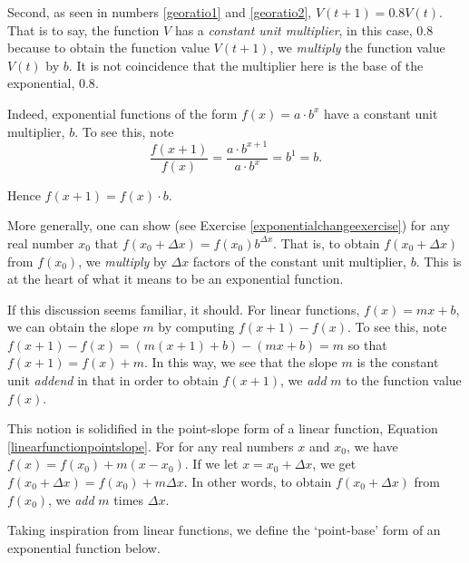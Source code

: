 \smallskip

Second, as seen in numbers \ref{georatio1} and \ref{georatio2},  $V(t+1) = 0.8 V(t)$.  That is to say, the function $V$ has a \textit{constant unit multiplier}, in this case, $0.8$ because to obtain the function value $V(t+1)$, we \textit{multiply} the function value $V(t)$ by $b$.   It is not coincidence that the multiplier here is the base of the exponential, $0.8$.

\smallskip

Indeed, exponential functions of the form $f(x) = a \cdot b^{x}$  have a constant unit multiplier, $b$.  To see this,  note \[ \dfrac{f(x+1)}{f(x)} = \dfrac{a \cdot b^{x+1}}{ a \cdot b^{x}} = b^{1} = b.\]

Hence $f(x+1) = f(x) \cdot b$.   

\smallskip

More generally, one can show (see Exercise \ref{exponentialchangeexercise}) for any real number $x_{0}$ that $f(x_{0}+\Delta x) = f(x_{0}) b^{\Delta x}$. That is, to obtain $f(x_{0} + \Delta x)$ from $f(x_{0})$, we \textit{multiply} by $\Delta x$ factors of the constant unit multiplier, $b$.  This is at the heart of what it means to be an exponential function.

\smallskip

If this discussion seems familiar, it should.  For linear functions, $f(x) = mx +b$, we can obtain the slope $m$ by computing $f(x+1) - f(x)$.  To see this, note $f(x+1) - f(x)  = (m(x+1) +b) - (mx+b) = m$ so that $f(x+1) = f(x) + m$.  In this way, we see that the slope $m$ is the constant unit \textit{addend} in that in order to obtain $f(x+1)$, we \textit{add} $m$ to the function value $f(x)$.  

\smallskip

This notion is solidified in the point-slope form of a linear function,  Equation \ref{linearfunctionpointslope}.  For for any real numbers $x$ and $x_{0}$, we have   $f(x) = f(x_{0}) + m(x-x_{0})$.  If we let $x = x_{0}+ \Delta x$, we get $f(x_{0}+ \Delta x) = f(x_{0}) + m \Delta x$.  In other words, to obtain $f(x_{0}+\Delta x)$ from $f(x_{0})$, we \textit{add} $m$ times $\Delta x$. 

\smallskip

Taking inspiration from linear functions, we define the `point-base' form of an exponential function below.

